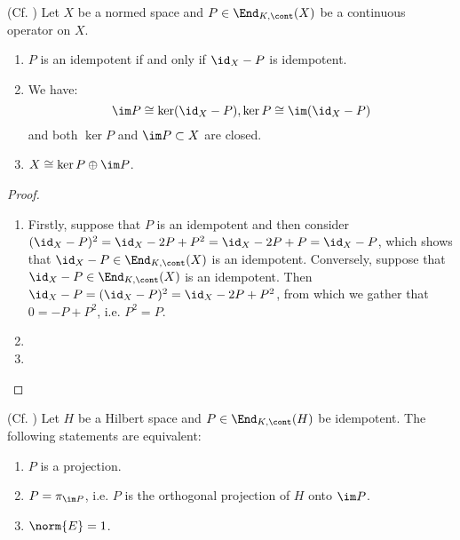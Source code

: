         \begin{lemma} \label{lemma: properties_of_idempotent_continuous_operators}
            (Cf. \cite[Proposition II.3.2]{conway_functional_analysis}) Let $X$ be a normed space and $P \in \End_{K, \cont}(X)$ be a continuous operator on $X$.
            \begin{enumerate}
                \item $P$ is an idempotent if and only if $\id_X - P$ is idempotent.
                \item We have:
                    $$\im P \cong \ker(\id_X - P), \ker P \cong \im(\id_X - P)$$
                and both $\ker P$ and $\im P \subset X$ are closed. 
                \item $X \cong \ker P \oplus \im P$.
            \end{enumerate}
        \end{lemma}
            \begin{proof}
                \begin{enumerate}
                    \item Firstly, suppose that $P$ is an idempotent and then consider $(\id_X - P)^2 = \id_X - 2P + P^2 = \id_X - 2P + P = \id_X - P$, which shows that $\id_X - P \in \End_{K, \cont}(X)$ is an idempotent. Conversely, suppose that $\id_X - P \in \End_{K, \cont}(X)$ is an idempotent. Then $\id_X - P = (\id_X - P)^2 = \id_X - 2P + P^2$, from which we gather that $0 = -P + P^2$, i.e. $P^2 = P$.
                    \item 
                    \item 
                \end{enumerate}
            \end{proof}
        \begin{proposition} \label{prop: which_continuous_linear_maps_are_orthogonal_projections}
            (Cf. \cite[Proposition II.3.3]{conway_functional_analysis}) Let $H$ be a Hilbert space and $P \in \End_{K, \cont}(H)$ be idempotent. The following statements are equivalent:
            \begin{enumerate}
                \item $P$ is a projection.
                \item $P = \pi_{\im P}$, i.e. $P$ is the orthogonal projection of $H$ onto $\im P$.
                \item $\norm{E} = 1$.
            \end{enumerate}
        \end{proposition}
